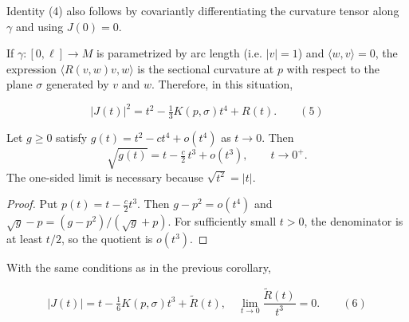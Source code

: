 \begin{remark}
  \label{rem:dc-ch5-2-8}
  Identity (4) also follows by covariantly differentiating the curvature
  tensor along $\gamma$ and using $J(0)=0$.
\end{remark}

\begin{corollary}
  \label{cor:dc-ch5-2-9}
  \leanok
  If $\gamma:[0,\ell]\to M$ is parametrized by arc length (i.e. $|v|=1$) and
  $\langle w,v\rangle=0$, the expression $\langle R(v,w)v,w\rangle$ is the sectional
  curvature at $p$ with respect to the plane $\sigma$ generated by $v$ and $w$.
  Therefore, in this situation,

  $$
  |J(t)|^2=t^2-\tfrac{1}{3}K(p,\sigma)t^4+R(t).\qquad(5)
  $$

\end{corollary}

\begin{lemma}
  \label{lem:dc-ch5-2-10-sqrt}
  \leanok
  Let $g\ge0$ satisfy $g(t)=t^2-ct^4+o(t^4)$ as $t\to0$. Then
  $$
  \sqrt{g(t)}=t-\tfrac{c}{2}\,t^3+o(t^3),\qquad t\to 0^+.
  $$
  The one-sided limit is necessary because $\sqrt{t^2}=|t|$.
\end{lemma}
\begin{proof}

  \sketch
  Put $p(t)=t-\tfrac c2t^3$. Then $g-p^2=o(t^4)$ and
  $\sqrt g-p=(g-p^2)/(\sqrt g+p)$. For sufficiently small $t>0$, the denominator
  is at least $t/2$, so the quotient is $o(t^3)$.
\end{proof}

\begin{corollary}
  \label{cor:dc-ch5-2-10}
  \leanok
  With the same conditions as in the previous corollary,

  $$
  |J(t)|=t-\tfrac{1}{6}K(p,\sigma)t^3+\tilde R(t),\quad\lim_{t\to 0}\frac{\tilde R(t)}{t^3}=0.\qquad(6)
  $$

\end{corollary}

